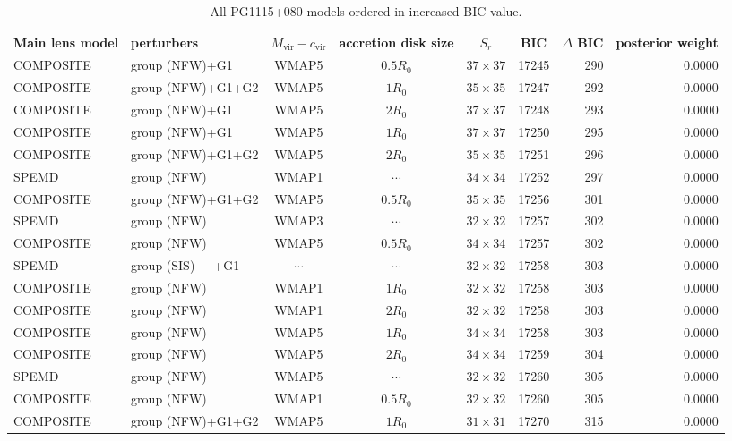 \documentclass[useAMS,usenatbib]{mnras}
\def\nomicro{$\cdots$}
\def\nodata{$\cdots$}
\begin{document}
\begin{table}
    \centering
    \caption{All PG1115+080 models ordered in increased BIC value.}
    \label{tab:6TD}
    \begin{tabular}{llccccrr}
        \hline
        Main lens model & perturbers &$M_{\textrm{vir}}-c_{\textrm{vir}}$& accretion disk size & $S_{r}$ & BIC & $\Delta$ BIC & posterior weight\\
        \hline
        COMPOSITE & group (NFW)+G1    &WMAP5 & $0.5R_{0}$&$37\times37$ & 17245 & 290 & 0.0000\\
        COMPOSITE & group (NFW)+G1+G2 &WMAP5 & $1R_{0}$&$35\times35$ & 17247 & 292 & 0.0000\\
        COMPOSITE & group (NFW)+G1    &WMAP5 & $2R_{0}$&$37\times37$ & 17248 & 293 & 0.0000\\
        COMPOSITE & group (NFW)+G1    &WMAP5 & $1R_{0}$&$37\times37$ & 17250 & 295 & 0.0000\\
        COMPOSITE & group (NFW)+G1+G2 &WMAP5 & $2R_{0}$&$35\times35$ & 17251 & 296 & 0.0000\\
        SPEMD     & group (NFW)       &WMAP1 & \nomicro&$34\times34$ & 17252 & 297 & 0.0000\\
        COMPOSITE & group (NFW)+G1+G2 &WMAP5 & $0.5R_{0}$&$35\times35$ & 17256 & 301 & 0.0000\\
        SPEMD     & group (NFW)       &WMAP3 & \nomicro&$32\times32$ & 17257 & 302 & 0.0000\\
        COMPOSITE & group (NFW)       &WMAP5 & $0.5R_{0}$&$34\times34$ & 17257 & 302 & 0.0000\\
        SPEMD     & group (SIS)~~~+G1 &\nodata& \nomicro&$32\times32$ & 17258 & 303 & 0.0000\\
        COMPOSITE & group (NFW)       &WMAP1 & $1R_{0}$&$32\times32$ & 17258 & 303 & 0.0000\\
        COMPOSITE & group (NFW)       &WMAP1 & $2R_{0}$&$32\times32$ & 17258 & 303 & 0.0000\\
        COMPOSITE & group (NFW)       &WMAP5 & $1R_{0}$&$34\times34$ & 17258 & 303 & 0.0000\\
        COMPOSITE & group (NFW)       &WMAP5 & $2R_{0}$&$34\times34$ & 17259 & 304 & 0.0000\\
        SPEMD     & group (NFW)       &WMAP5 & \nomicro&$32\times32$ & 17260 & 305 & 0.0000\\
        COMPOSITE & group (NFW)       &WMAP1 & $0.5R_{0}$&$32\times32$ & 17260 & 305 & 0.0000\\
        COMPOSITE & group (NFW)+G1+G2 &WMAP5 & $1R_{0}$&$31\times31$ & 17270 & 315 & 0.0000\\

\end{tabular}
\end{table}
\end{document}

